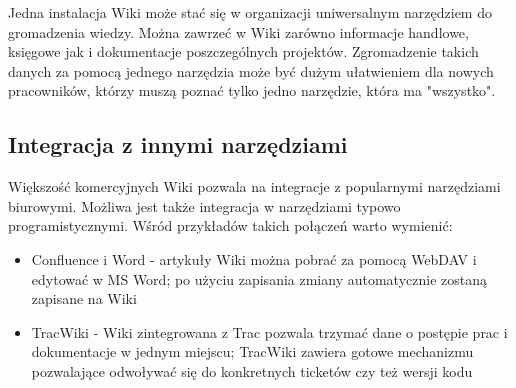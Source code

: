 \documentclass{article}
\begin{document}
	Jedna instalacja Wiki może stać się w organizacji uniwersalnym narzędziem do gromadzenia wiedzy. Można zawrzeć w Wiki zarówno informacje handlowe, księgowe jak i dokumentacje poszczególnych projektów. Zgromadzenie takich danych za pomocą jednego narzędzia może być dużym ułatwieniem dla nowych pracowników, którzy muszą poznać tylko jedno narzędzie, która ma "wszystko". 



	\subsection{Integracja z innymi narzędziami}

	Większość komercyjnych Wiki pozwala na integracje z popularnymi narzędziami biurowymi. Możliwa jest także integracja w narzędziami typowo programistycznymi. Wśród przykładów takich połączeń warto wymienić:

\begin{itemize}
\item Confluence i Word - artykuły Wiki można pobrać za pomocą WebDAV i  edytować w MS Word; po użyciu zapisania zmiany automatycznie zostaną zapisane na Wiki
\item TracWiki - Wiki zintegrowana z Trac pozwala trzymać dane o postępie prac i dokumentacje w jednym miejscu; TracWiki zawiera gotowe mechanizmu pozwalające odwoływać się do konkretnych ticketów czy też wersji kodu 

\end{itemize} 
\end{document}

